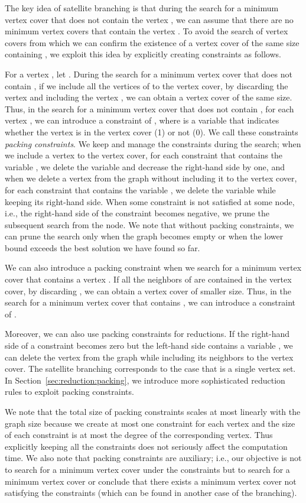 \documentclass[11pt]{article}
\begin{document}
The key idea of satellite branching is that during the search for a minimum vertex cover that does not contain
the vertex , we can assume that there are no minimum vertex covers that contain the vertex .
To avoid the search of vertex covers from which we can confirm the existence of a vertex cover of the same size containing ,
we exploit this idea by explicitly creating constraints as follows.

For a vertex , let .
During the search for a minimum vertex cover that does not contain , if we include all the vertices of
 to the vertex cover, by discarding the vertex  and including the vertex , we can obtain a vertex cover of
the same size.
Thus, in the search for a minimum vertex cover that does not contain , for each vertex , we can introduce a constraint of , where  is a variable that indicates
whether the vertex  is in the vertex cover (1) or not (0).
We call these constraints \emph{packing constraints}.
We keep and manage the constraints during the search;
when we include a vertex  to the vertex cover, for each constraint that contains the variable , we delete
the variable and decrease the right-hand side by one,
and when we delete a vertex  from the graph without including it to the vertex cover,
for each constraint that contains the variable , we delete the variable while keeping its right-hand side.
When some constraint is not satisfied at some node, i.e., the right-hand side of the constraint becomes negative, we
prune the subsequent search from the node.
We note that without packing constraints, we can prune the search only when the graph becomes empty or when the lower
bound exceeds the best solution we have found so far.

We can also introduce a packing constraint when we search for a minimum vertex cover that contains a vertex .
If all the neighbors of  are contained in the vertex cover, by discarding , we can obtain a vertex cover of
smaller size.
Thus, in the search for a minimum vertex cover that contains , we can introduce a constraint of .

Moreover, we can also use packing constraints for reductions.
If the right-hand side of a constraint becomes zero but the left-hand side contains a variable , we can delete the
vertex  from the graph while including its neighbors  to the vertex cover.
The satellite branching corresponds to the case that  is a single vertex set.
In Section~\ref{sec:reduction:packing}, we introduce more sophisticated reduction rules to exploit packing constraints.

We note that the total size of packing constraints scales at most linearly with the graph size because we create at most one
constraint for each vertex  and the size of each constraint is at most the degree of the corresponding vertex.
Thus explicitly keeping all the constraints does not seriously affect the computation time.
We also note that packing constraints are auxiliary;
i.e., our objective is not to search for a minimum vertex cover under the constraints
but to search for a minimum vertex cover or conclude that there exists a minimum
vertex cover not satisfying the constraints (which can be found in another case of the branching).
\end{document}
